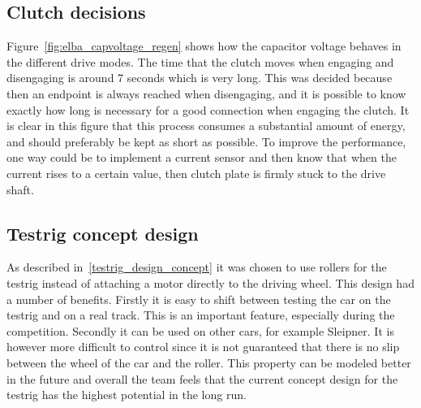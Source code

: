 \subsection{Clutch decisions}
Figure~\ref{fig:elba_capvoltage_regen} shows how the capacitor voltage behaves in the different drive modes.
The time that the clutch moves when engaging and disengaging is around 7 seconds which is very long. This was decided because then an endpoint is always reached when disengaging, and it is possible to know exactly how long is necessary 
for a good connection when engaging the clutch. It is clear in this figure that this process consumes a substantial 
amount of energy, and should preferably be kept as short as possible. To improve the performance, one way could be to implement a current sensor and then know that when the current rises to a certain value, then clutch plate is firmly stuck to the drive shaft.

\subsection{Testrig concept design}\label{sec:discussion_testrig_concept}
As described in~\ref{testrig_design_concept} it was chosen to use rollers for the testrig instead of attaching a motor directly to the driving wheel. This design had a number of benefits. Firstly it is easy to shift between testing the car on the testrig and on a real track. This is an important feature, especially during the competition. Secondly it can be used on other cars, for example Sleipner. It is however more difficult to control since it is not guaranteed that there is no slip between the wheel of the car and the roller. This property can be modeled better in the future and overall the team feels that the current concept design for the testrig has the highest potential in the long run.

